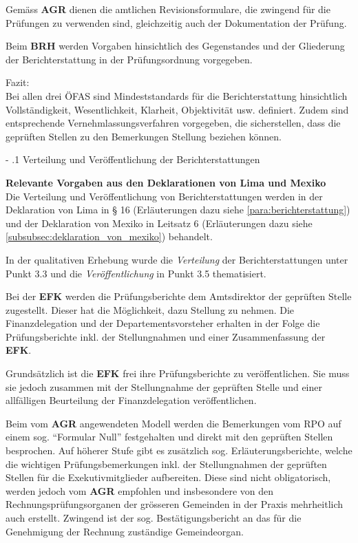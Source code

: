 \documentclass[10pt]{article}
\makeatletter
\renewcommand\subparagraph{\@startsection{subparagraph}{4}{0mm}{-\baselineskip}{.1\baselineskip}{\normalfont\normalsize\bfseries}}
\renewcommand\subparagraph{%
\@startsection{subparagraph}{4}{0mm}%
{-\baselineskip}%
{.1\baselineskip}%
{\normalfont\normalsize\bfseries}}
\makeatother
\begin{document}
Gemäss \textbf{AGR} dienen die amtlichen Revisionsformulare, die zwingend für die Prüfungen zu verwenden sind, gleichzeitig auch der Dokumentation der Prüfung.

Beim \textbf{BRH} werden Vorgaben hinsichtlich des Gegenstandes und der Gliederung der Berichterstattung in der Prüfungsordnung vorgegeben.

Fazit:\\
Bei allen drei ÖFAS sind Mindeststandards für die Berichterstattung hinsichtlich Vollständigkeit, Wesentlichkeit, Klarheit, Objektivität usw. definiert. Zudem sind entsprechende Vernehmlassungsverfahren vorgegeben, die sicherstellen, dass die geprüften Stellen zu den Bemerkungen Stellung beziehen können.

\subparagraph{Verteilung und Veröffentlichung der Berichterstattungen}\label{subpara:verteilung_und_veroeffentlichung_der_berichterstattungen}
\begin{shaded}
\textbf{Relevante Vorgaben aus den Deklarationen von Lima und Mexiko}\\
Die Verteilung und Veröffentlichung von Berichterstattungen werden in der Deklaration von Lima in § 16 (Erläuterungen dazu siehe \vref{para:berichterstattung}) und der Deklaration von Mexiko in Leitsatz 6 (Erläuterungen dazu siehe \vref{subsubsec:deklaration_von_mexiko}) behandelt.

\end{shaded}
In der qualitativen Erhebung wurde die \textit{Verteilung} der Berichterstattungen unter Punkt 3.3 und die \textit{Veröffentlichung} in Punkt 3.5 thematisiert.

Bei der \textbf{EFK }werden die Prüfungsberichte dem Amtsdirektor der geprüften Stelle zugestellt. Dieser hat die Möglichkeit, dazu Stellung zu nehmen. Die Finanzdelegation und der Departementsvorsteher erhalten in der Folge die Prüfungsberichte inkl. der Stellungnahmen und einer Zusammenfassung der \textbf{EFK}.

Grundsätzlich ist die \textbf{EFK} frei ihre Prüfungsberichte zu veröffentlichen. Sie muss sie jedoch zusammen mit der Stellungnahme der geprüften Stelle und einer allfälligen Beurteilung der Finanzdelegation veröffentlichen.

Beim vom \textbf{AGR} angewendeten Modell werden die Bemerkungen vom RPO auf einem sog. “{}Formular Null”{} festgehalten und direkt mit den geprüften Stellen besprochen. Auf höherer Stufe gibt es zusätzlich sog. Erläuterungsberichte, welche die wichtigen Prüfungsbemerkungen inkl. der Stellungnahmen der geprüften Stellen für die Exekutivmitglieder aufbereiten. Diese sind nicht obligatorisch, werden jedoch vom \textbf{AGR} empfohlen und insbesondere von den Rechnungsprüfungsorganen der grösseren Gemeinden in der Praxis mehrheitlich auch erstellt. Zwingend ist der sog. Bestätigungs­bericht an das für die Genehmigung der Rechnung zuständige Gemeinde­organ.
\end{document}
